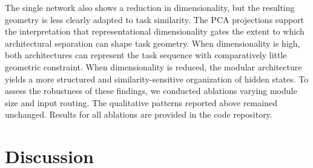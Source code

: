\documentclass[letterpaper]{article}
\begin{document}
        The single network also shows a reduction in dimensionality, but the resulting geometry is less clearly adapted to task similarity. The PCA projections support the interpretation that representational dimensionality gates the extent to which architectural separation can shape task geometry. When dimensionality is high, both architectures can represent the task sequence with comparatively little geometric constraint. When dimensionality is reduced, the modular architecture yields a more structured and similarity-sensitive organization of hidden states.%
        To assess the robustness of these findings, we conducted ablations varying module size and input routing. The qualitative patterns reported above remained unchanged. Results for all ablations are provided in the code repository.

\section{Discussion}
\end{document}
